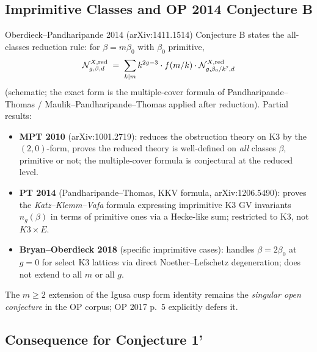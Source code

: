 \subsection*{Imprimitive Classes and OP 2014 Conjecture B}

Oberdieck--Pandharipande 2014 (arXiv:1411.1514) Conjecture B states
the all-classes reduction rule: for $\beta = m\beta_0$ with
$\beta_0$ primitive,
\[
  \mathcal{N}^{X,\mathrm{red}}_{g,\beta,d}
  \;=\; \sum_{k \mid m} k^{2g-3} \cdot f(m/k) \cdot
  \mathcal{N}^{X,\mathrm{red}}_{g,\beta_0/k^{?},d}
\]
(schematic; the exact form is the multiple-cover formula of
Pandharipande--Thomas / Maulik--Pandharipande--Thomas applied after
reduction).  Partial results:
\begin{itemize}
\item \textbf{MPT 2010} (arXiv:1001.2719): reduces the obstruction
theory on K3 by the $(2,0)$-form, proves the reduced theory is
well-defined on \emph{all} classes $\beta$, primitive or not; the
multiple-cover formula is conjectural at the reduced level.
\item \textbf{PT 2014} (Pandharipande--Thomas, KKV formula,
arXiv:1206.5490): proves the \emph{Katz--Klemm--Vafa} formula
expressing imprimitive K3 GV invariants $n_g(\beta)$ in terms of
primitive ones via a Hecke-like sum; restricted to K3, not
$K3\times E$.
\item \textbf{Bryan--Oberdieck 2018} (specific imprimitive cases):
handles $\beta = 2\beta_0$ at $g=0$ for select K3 lattices via
direct Noether--Lefschetz degeneration; does not extend to all
$m$ or all $g$.
\end{itemize}
The $m \ge 2$ extension of the Igusa cusp form identity remains the
\emph{singular open conjecture} in the OP corpus; OP 2017 p.~5 explicitly
defers it.

\subsection*{Consequence for Conjecture 1'}

